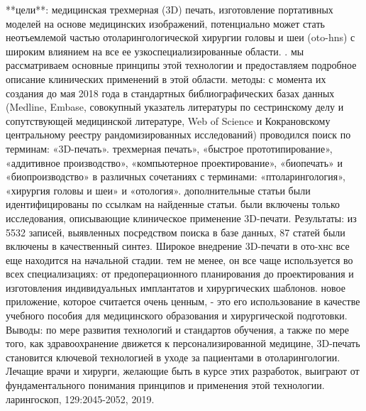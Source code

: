 **цели**: медицинская трехмерная (3D) печать, изготовление портативных моделей
на основе медицинских изображений, потенциально может стать неотъемлемой частью
отоларингологической хирургии головы и шеи (oto-hns) с широким влиянием на все
ее узкоспециализированные области. . мы рассматриваем основные принципы этой
технологии и предоставляем подробное описание клинических применений в этой
области. методы: с момента их создания до мая 2018 года в стандартных
библиографических базах данных (Medline, Embase, совокупный указатель литературы
по сестринскому делу и сопутствующей медицинской литературе, Web of Science и
Кокрановскому центральному реестру рандомизированных исследований) проводился
поиск по терминам: «3D-печать». трехмерная печать», «быстрое прототипирование»,
«аддитивное производство», «компьютерное проектирование», «биопечать» и
«биопроизводство» в различных сочетаниях с терминами: «птоларингология»,
«хирургия головы и шеи» и «отология». дополнительные статьи были
идентифицированы по ссылкам на найденные статьи. были включены только
исследования, описывающие клиническое применение 3D-печати. Результаты: из 5532
записей, выявленных посредством поиска в базе данных, 87 статей были включены в
качественный синтез. Широкое внедрение 3D-печати в ото-хнс все еще находится на
начальной стадии. тем не менее, он все чаще используется во всех специализациях:
от предоперационного планирования до проектирования и изготовления
индивидуальных имплантатов и хирургических шаблонов. новое приложение, которое
считается очень ценным, - это его использование в качестве учебного пособия для
медицинского образования и хирургической подготовки. Выводы: по мере развития
технологий и стандартов обучения, а также по мере того, как здравоохранение
движется к персонализированной медицине, 3D-печать становится ключевой
технологией в уходе за пациентами в отоларингологии. Лечащие врачи и хирурги,
желающие быть в курсе этих разработок, выиграют от фундаментального понимания
принципов и применения этой технологии. ларингоскоп, 129:2045-2052,
2019.\cite{30698840}
